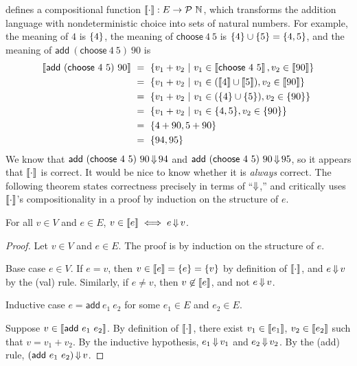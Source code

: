 { defines a compositional function $\left\llbracket{\cdot}\right\rrbracket : E \to \mathcal{P}~\mathbb{N}$, which transforms the addition language with nondeterministic choice into sets of natural numbers.
For example, the meaning of $4$ is $\{{4}\}$, the meaning of $\mathsf{choose}~4~5$ is $\{{4}\} \cup \{{5}\} = \{{4,5}\}$, and the meaning of $\mathsf{add}~(\mathsf{choose}~4~5)~90$ is
\begin{equation}
\begin{aligned}
	\left\llbracket{\mathsf{add}~(\mathsf{choose}~4~5)~90}\right\rrbracket
	&\ =\ \lbrace {v_1 + v_2} \ \lvert\ {v_1 \in \left\llbracket{\mathsf{choose}~4~5}\right\rrbracket, v_2 \in \left\llbracket{90}\right\rrbracket} \rbrace
\\
	&\ =\ \lbrace {v_1 + v_2} \ \lvert\ {v_1 \in (\left\llbracket{4}\right\rrbracket \cup \left\llbracket{5}\right\rrbracket), v_2 \in \left\llbracket{90}\right\rrbracket} \rbrace 
\\
	&\ =\ \lbrace {v_1 + v_2} \ \lvert\ {v_1 \in (\{{4}\} \cup \{{5}\}), v_2 \in \{{90}\}} \rbrace
\\
	&\ =\ \lbrace {v_1 + v_2} \ \lvert\ {v_1 \in \{{4,5}\}, v_2 \in \{{90}\}} \rbrace
\\
	&\ =\ \{{4+90,5+90}\}
\\
	&\ =\ \{{94,95}\}
\end{aligned}
\end{equation}
We know that $\mathsf{add}~(\mathsf{choose}~4~5)~90 \operatorname{\Downarrow} 94$ and $\mathsf{add}~(\mathsf{choose}~4~5)~90 \operatorname{\Downarrow} 95$, so it appears that $\left\llbracket{\cdot}\right\rrbracket$ is correct.
It would be nice to know whether it is \emph{always} correct.
The following theorem states correctness precisely in terms of ``$\operatorname{\Downarrow}$,'' and critically uses $\left\llbracket{\cdot}\right\rrbracket$'s compositionality in a proof by induction on the structure of $e$.

\begin{theorem}
For all $v \in V$ and $e \in E$, $v \in \left\llbracket{e}\right\rrbracket \iff e \operatorname{\Downarrow} v$.
\end{theorem}
\begin{proof}
Let $v \in V$ and $e \in E$.
The proof is by induction on the structure of $e$.

Base case $e \in V$.
If $e = v$, then $v \in \left\llbracket{e}\right\rrbracket = \{{e}\} = \{{v}\}$ by definition of $\left\llbracket{\cdot}\right\rrbracket$, and $e \operatorname{\Downarrow} v$ by the (val) rule.
Similarly, if $e \neq v$, then $v \not\in \left\llbracket{e}\right\rrbracket$, and not $e \operatorname{\Downarrow} v$.

Inductive case $e = \mathsf{add}~e_1~e_2$ for some $e_1 \in E$ and $e_2 \in E$.

Suppose $v \in \left\llbracket{\mathsf{add}~e_1~e_2}\right\rrbracket$.
By definition of $\left\llbracket{\cdot}\right\rrbracket$, there exist $v_1 \in \left\llbracket{e_1}\right\rrbracket$, $v_2 \in \left\llbracket{e_2}\right\rrbracket$ such that $v = v_1 + v_2$.
By the inductive hypothesis, $e_1 \operatorname{\Downarrow} v_1$ and $e_2 \operatorname{\Downarrow} v_2$.
By the (add) rule, $(\mathsf{add}~e_1~e_2) \operatorname{\Downarrow} v$.


\end{proof}}
